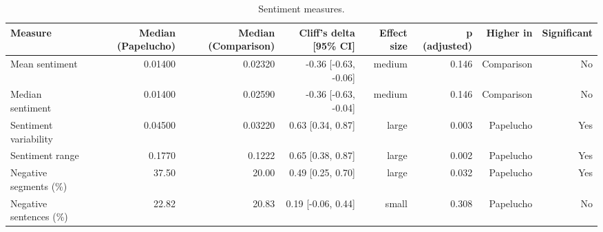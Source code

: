 \begin{table}[htbp]
\centering
\small
\caption{Sentiment measures.}
\label{tab:sentiment-results}
\begin{tabular}{lrrrrrrr}
\toprule
\textbf{Measure} & \textbf{Median (Papelucho)} & \textbf{Median (Comparison)} & \textbf{Cliff's delta [95\% CI]} & \textbf{Effect size} & \textbf{p (adjusted)} & \textbf{Higher in} & \textbf{Significant} \\
\midrule
Mean sentiment & 0.01400 & 0.02320 & -0.36 [-0.63, -0.06] & medium & 0.146 & Comparison & No \\
Median sentiment & 0.01400 & 0.02590 & -0.36 [-0.63, -0.04] & medium & 0.146 & Comparison & No \\
Sentiment variability & 0.04500 & 0.03220 & 0.63 [0.34, 0.87] & large & 0.003 & Papelucho & Yes \\
Sentiment range & 0.1770 & 0.1222 & 0.65 [0.38, 0.87] & large & 0.002 & Papelucho & Yes \\
Negative segments (\%) & 37.50 & 20.00 & 0.49 [0.25, 0.70] & large & 0.032 & Papelucho & Yes \\
Negative sentences (\%) & 22.82 & 20.83 & 0.19 [-0.06, 0.44] & small & 0.308 & Papelucho & No \\
\bottomrule
\end{tabular}
\end{table}

